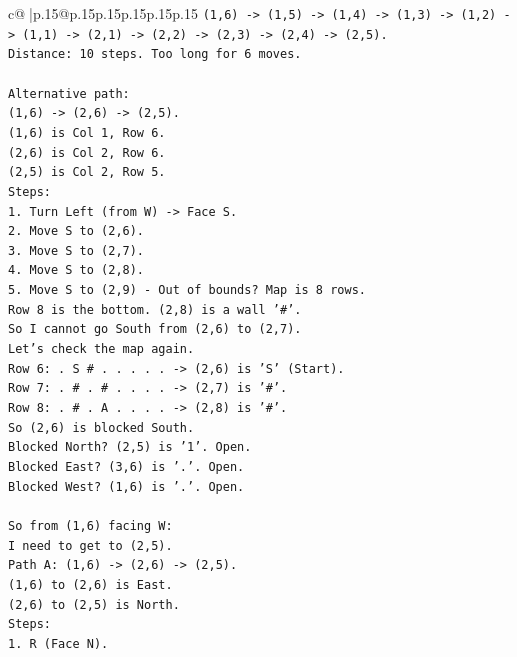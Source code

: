 \documentclass{article}
\begin{document}
{\begin{supertabular}{c@{$\;$}|p{.15\linewidth}@{}p{.15\linewidth}p{.15\linewidth}p{.15\linewidth}p{.15\linewidth}p{.15\linewidth}}
{{{\texttt{(1,6) {-}> (1,5) {-}> (1,4) {-}> (1,3) {-}> (1,2) {-}> (1,1) {-}> (2,1) {-}> (2,2) {-}> (2,3) {-}> (2,4) {-}> (2,5).} \\
\texttt{Distance: 10 steps. Too long for 6 moves.} \\
\\ 
\texttt{Alternative path:} \\
\texttt{(1,6) {-}> (2,6) {-}> (2,5).} \\
\texttt{(1,6) is Col 1, Row 6.} \\
\texttt{(2,6) is Col 2, Row 6.} \\
\texttt{(2,5) is Col 2, Row 5.} \\
\texttt{Steps:} \\
\texttt{1. Turn Left (from W) {-}> Face S.} \\
\texttt{2. Move S to (2,6).} \\
\texttt{3. Move S to (2,7).} \\
\texttt{4. Move S to (2,8).} \\
\texttt{5. Move S to (2,9) {-} Out of bounds? Map is 8 rows.} \\
\texttt{Row 8 is the bottom. (2,8) is a wall '\#'.} \\
\texttt{So I cannot go South from (2,6) to (2,7).} \\
\texttt{Let's check the map again.} \\
\texttt{Row 6: . S \# . . . . . {-}> (2,6) is 'S' (Start).} \\
\texttt{Row 7: . \# . \# . . . . {-}> (2,7) is '\#'.} \\
\texttt{Row 8: . \# . A . . . . {-}> (2,8) is '\#'.} \\
\texttt{So (2,6) is blocked South.} \\
\texttt{Blocked North? (2,5) is '1'. Open.} \\
\texttt{Blocked East? (3,6) is '.'. Open.} \\
\texttt{Blocked West? (1,6) is '.'. Open.} \\
\\ 
\texttt{So from (1,6) facing W:} \\
\texttt{I need to get to (2,5).} \\
\texttt{Path A: (1,6) {-}> (2,6) {-}> (2,5).} \\
\texttt{(1,6) to (2,6) is East.} \\
\texttt{(2,6) to (2,5) is North.} \\
\texttt{Steps:} \\
\texttt{1. R (Face N).} \\
}}}
\end{supertabular}}
\end{document}
